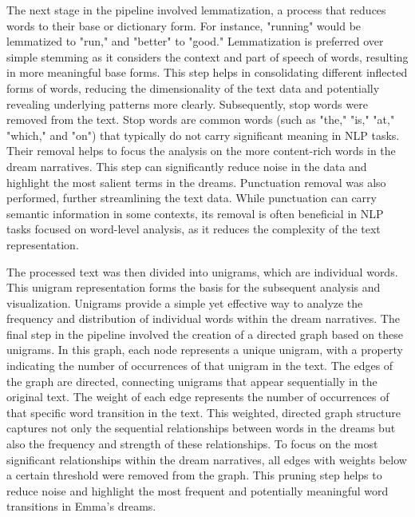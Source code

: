 The next stage in the pipeline involved lemmatization, a process that reduces words to their base or dictionary form. For instance, "running" would be lemmatized to "run," and "better" to "good." Lemmatization is preferred over simple stemming as it considers the context and part of speech of words, resulting in more meaningful base forms. This step helps in consolidating different inflected forms of words, reducing the dimensionality of the text data and potentially revealing underlying patterns more clearly. Subsequently, stop words were removed from the text. Stop words are common words (such as "the," "is," "at," "which," and "on") that typically do not carry significant meaning in NLP tasks. Their removal helps to focus the analysis on the more content-rich words in the dream narratives. This step can significantly reduce noise in the data and highlight the most salient terms in the dreams. Punctuation removal was also performed, further streamlining the text data. While punctuation can carry semantic information in some contexts, its removal is often beneficial in NLP tasks focused on word-level analysis, as it reduces the complexity of the text representation.

The processed text was then divided into unigrams, which are individual words. This unigram representation forms the basis for the subsequent analysis and visualization. Unigrams provide a simple yet effective way to analyze the frequency and distribution of individual words within the dream narratives. The final step in the pipeline involved the creation of a directed graph based on these unigrams. In this graph, each node represents a unique unigram, with a property indicating the number of occurrences of that unigram in the text. The edges of the graph are directed, connecting unigrams that appear sequentially in the original text. The weight of each edge represents the number of occurrences of that specific word transition in the text. This weighted, directed graph structure captures not only the sequential relationships between words in the dreams but also the frequency and strength of these relationships. To focus on the most significant relationships within the dream narratives, all edges with weights below a certain threshold were removed from the graph. This pruning step helps to reduce noise and highlight the most frequent and potentially meaningful word transitions in Emma's dreams.

